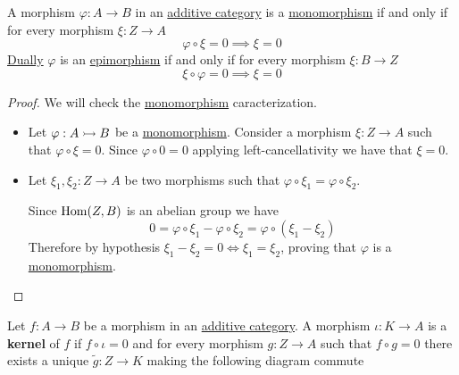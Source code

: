 \documentclass[../../../main]{subfiles}
\begin{document}
\begin{lemma} \label{lemma:mono-epi-additive}
  A morphism \(\varphi: A \to B\) in an \hyperref[def:additive-category]{additive category} is a \hyperref[def:mono-epi-morphism]{monomorphism} if and only if for every morphism \(\xi: Z \to A\)
  \begin{equation*}
    \varphi \circ \xi = 0 \implies \xi = 0
  \end{equation*}
  \hyperref[def:dual]{Dually} \(\varphi\) is an \hyperref[def:mono-epi-morphism]{epimorphism} if and only if for every morphism \(\xi: B \to Z\)
  \begin{equation*}
    \xi \circ \varphi = 0 \implies \xi = 0
  \end{equation*}
\end{lemma}
\begin{proof}
  We will check the \hyperref[def:mono-epi-morphism]{monomorphism} caracterization.
  \begin{itemize}
    \item[\(\implies\)] Let \(\varphi: A \rightarrowtail B\) be a \hyperref[def:mono-epi-morphism]{monomorphism}.
          Consider a morphism \(\xi: Z \to A\) such that \(\varphi \circ \xi = 0\).
          Since \(\varphi \circ 0 = 0\) applying left-cancellativity we have that \(\xi = 0\).
    \item[\(\impliedby\)] Let \(\xi_{1}, \xi_{2}: Z \to A\) be two morphisms such that \(\varphi \circ \xi_{1} = \varphi \circ \xi_{2}\).

          Since \(\operatorname{Hom}(Z, B)\) is an abelian group we have
          \begin{equation*}
            0 = \varphi \circ \xi_{1} - \varphi \circ \xi_{2} = \varphi \circ (\xi_{1} - \xi_{2})
          \end{equation*}
          Therefore by hypothesis \(\xi_{1} - \xi_{2} = 0 \iff \xi_{1} = \xi_{2}\), proving that \(\varphi\) is a \hyperref[def:mono-epi-morphism]{monomorphism}.
  \end{itemize}
\end{proof}


\begin{definition}[Kernel] \label{def:categorical-kernel}
  Let \(f: A \to B\) be a morphism in an \hyperref[def:additive-category]{additive category}.
  A morphism \(\iota: K \to A\) is a \textbf{kernel} of \(f\) if \(f \circ \iota = 0\) and for every morphism \(g: Z \to A\) such that \(f \circ g = 0\) there exists a unique \(\tilde{g}:Z \to K\) making the following diagram commute
  \begin{center}
  \end{center}
\end{definition}
\end{document}
